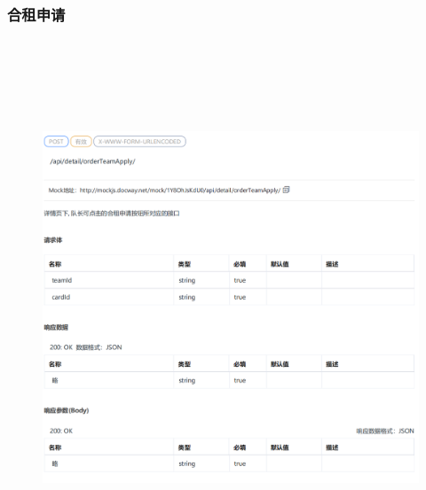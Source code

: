                 \subsubsection{合租申请} 
                \begin{figure}[h]
                    \centering
                    \includegraphics[height=16.0cm,width=14.0cm]{design/image/api11.png} 
                    \end{figure}  
                    \newpage 
